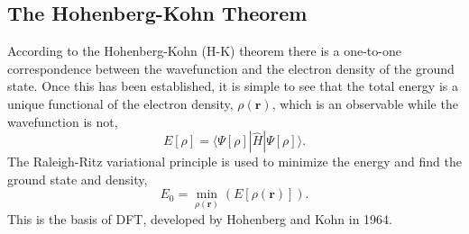 \subsection{The Hohenberg-Kohn Theorem}
According to the Hohenberg-Kohn (H-K) theorem there is a one-to-one correspondence between the wavefunction and the electron density of the ground state. Once this has been established, it is simple to see that the total energy is a unique functional of the electron density, $\rho(\textbf{r})$, which is an observable while the wavefunction is not,
\begin{equation}
\label{eq:H-KenergyDensity}
 E[\rho] = \langle \Psi[\rho] | \widehat{H} | \Psi[\rho] \rangle.
\end{equation}
The Raleigh-Ritz variational principle is used to minimize the energy and find the ground state and density, %
\begin{equation}
 E_{0} = \min_{\rho(\mathbf{r})} \left(E[\rho(\mathbf{r})] \right).
\label{eq:H-Kvariational}
\end{equation}
This is the basis of DFT, developed by Hohenberg and Kohn \cite{hohenberg1964} in 1964.

